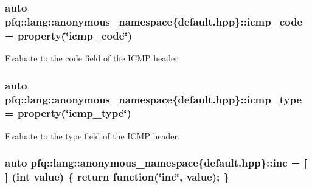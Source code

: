 \subsubsection[{\texorpdfstring{icmp\+\_\+code}{icmp_code}}]{\setlength{\rightskip}{0pt plus 5cm}auto pfq\+::lang\+::anonymous\+\_\+namespace\{default.\+hpp\}\+::icmp\+\_\+code = {\bf property}(\char`\"{}icmp\+\_\+code\char`\"{})}\hypertarget{namespacepfq_1_1lang_1_1anonymous__namespace_02default_8hpp_03_a026262dd85de1db88a8303ed0f3dac18}{}\label{namespacepfq_1_1lang_1_1anonymous__namespace_02default_8hpp_03_a026262dd85de1db88a8303ed0f3dac18}


Evaluate to the {\ttfamily code} field of the I\+C\+MP header. 

\subsubsection[{\texorpdfstring{icmp\+\_\+type}{icmp_type}}]{\setlength{\rightskip}{0pt plus 5cm}auto pfq\+::lang\+::anonymous\+\_\+namespace\{default.\+hpp\}\+::icmp\+\_\+type = {\bf property}(\char`\"{}icmp\+\_\+type\char`\"{})}\hypertarget{namespacepfq_1_1lang_1_1anonymous__namespace_02default_8hpp_03_a0c15abbec8753be8bb160633f697ed4b}{}\label{namespacepfq_1_1lang_1_1anonymous__namespace_02default_8hpp_03_a0c15abbec8753be8bb160633f697ed4b}


Evaluate to the {\ttfamily type} field of the I\+C\+MP header. 

\subsubsection[{\texorpdfstring{inc}{inc}}]{\setlength{\rightskip}{0pt plus 5cm}auto pfq\+::lang\+::anonymous\+\_\+namespace\{default.\+hpp\}\+::inc = \mbox{[}$\,$\mbox{]} (int value) \{ return {\bf function}(\char`\"{}inc\char`\"{}, value); \}}\hypertarget{namespacepfq_1_1lang_1_1anonymous__namespace_02default_8hpp_03_acc7d3a4cca5eb30ff5456e19c613b174}{}\label{namespacepfq_1_1lang_1_1anonymous__namespace_02default_8hpp_03_acc7d3a4cca5eb30ff5456e19c613b174}


